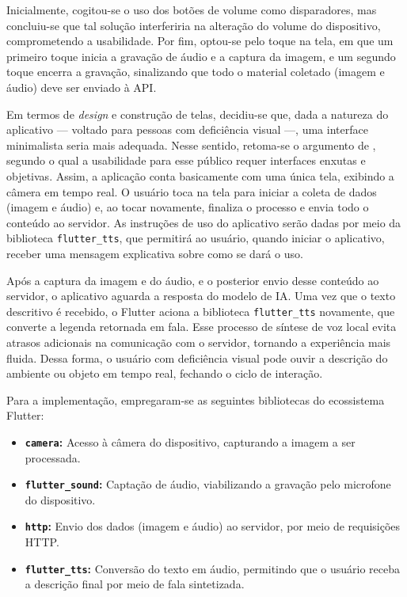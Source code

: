 Inicialmente, cogitou-se o uso dos botões de volume como disparadores, mas concluiu-se que tal solução interferiria na alteração do volume do dispositivo, comprometendo a usabilidade. Por fim, optou-se pelo toque na tela, em que um primeiro toque inicia a gravação de áudio e a captura da imagem, e um segundo toque encerra a gravação, sinalizando que todo o material coletado (imagem e áudio) deve ser enviado à API.

Em termos de \textit{design} e construção de telas, decidiu-se que, dada a natureza do aplicativo — voltado para pessoas com deficiência visual —, uma interface minimalista seria mais adequada. Nesse sentido, retoma-se o argumento de , segundo o qual a usabilidade para esse público requer interfaces enxutas e objetivas. Assim, a aplicação conta basicamente com uma única tela, exibindo a câmera em tempo real. O usuário toca na tela para iniciar a coleta de dados (imagem e áudio) e, ao tocar novamente, finaliza o processo e envia todo o conteúdo ao servidor. As instruções de uso do aplicativo serão dadas por meio da biblioteca \lstinline{flutter_tts}, que permitirá ao usuário, quando iniciar o aplicativo, receber uma mensagem explicativa sobre como se dará o uso.

Após a captura da imagem e do áudio, e o posterior envio desse conteúdo ao servidor, o aplicativo aguarda a resposta do modelo de IA. Uma vez que o texto descritivo é recebido, o Flutter aciona a biblioteca \lstinline{flutter_tts} novamente, que converte a legenda retornada em fala. Esse processo de síntese de voz local evita atrasos adicionais na comunicação com o servidor, tornando a experiência mais fluida. Dessa forma, o usuário com deficiência visual pode ouvir a descrição do ambiente ou objeto em tempo real, fechando o ciclo de interação.

Para a implementação, empregaram-se as seguintes bibliotecas do ecossistema Flutter:

\begin{itemize}
    \item \textbf{\lstinline{camera}:} Acesso à câmera do dispositivo, capturando a imagem a ser processada.
    \item \textbf{\lstinline{flutter_sound}:} Captação de áudio, viabilizando a gravação pelo microfone do dispositivo.
    \item \textbf{\lstinline{http}:} Envio dos dados (imagem e áudio) ao servidor, por meio de requisições HTTP.
    \item \textbf{\lstinline{flutter_tts}:} Conversão do texto em áudio, permitindo que o usuário receba a descrição final por meio de fala sintetizada.
\end{itemize}

